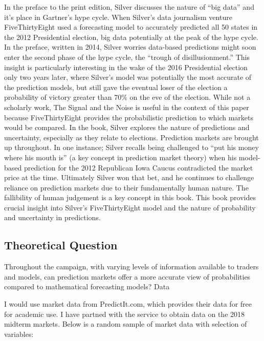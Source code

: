 \documentclass[]{article}
\begin{document}
In the preface to the print edition, Silver discusses the nature of
``big data'' and it's place in Gartner's hype cycle. When Silver's data
journalism venture FiveThirtyEight used a forecasting model to
accurately predicted all 50 states in the 2012 Presidential election,
big data potentially at the peak of the hype cycle. In the preface,
written in 2014, Silver worries data-based predictions might soon enter
the second phase of the hype cycle, the ``trough of disillusionment.''
This insight is particularly interesting in the wake of the 2016
Presidential election only two years later, where Silver's model was
potentially the most accurate of the prediction models, but still gave
the eventual loser of the election a probability of victory greater than
70\% on the eve of the election. While not a scholarly work, The Signal
and the Noise is useful in the context of this paper because
FiveThirtyEight provides the probabilistic prediction to which markets
would be compared. In the book, Silver explores the nature of
predictions and uncertainty, especially as they relate to elections.
Prediction markets are brought up throughout. In one instance; Silver
recalls being challenged to ``put his money where his mouth is'' (a key
concept in prediction market theory) when his model-based prediction for
the 2012 Republican Iowa Caucus contradicted the market price at the
time. Ultimately Silver won that bet, and he continues to challenge
reliance on prediction markets due to their fundamentally human nature.
The fallibility of human judgement is a key concept in this book. This
book provides crucial insight into Silver's FiveThirtyEight model and
the nature of probability and uncertainty in predictions.

\subsection{Theoretical Question}\label{theoretical-question}

Throughout the campaign, with varying levels of information available to
traders and models, can prediction markets offer a more accurate view of
probabilities compared to mathematical forecasting models? Data

I would use market data from PredictIt.com, which provides their data
for free for academic use. I have partned with the service to obtain
data on the 2018 midterm markets. Below is a random sample of market
data with selection of variables:
\end{document}
